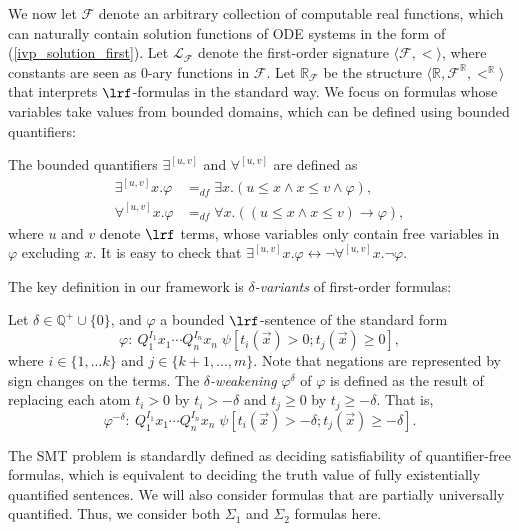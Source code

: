 \documentclass[11pt]{article}
\begin{document}
We now let $\mathcal{F}$ denote an arbitrary collection of computable real functions, which can naturally contain solution functions of ODE systems in the form of (\ref{ivp_solution_first}). Let $\mathcal{L}_{\mathcal{F}}$ denote the first-order signature $\langle \mathcal{F}, <\rangle$, where constants are seen as 0-ary functions in $\mathcal{F}$. Let $\mathbb{R}_{\mathcal{F}}$ be the  structure $\langle \mathbb{R}, \mathcal{F}^{\mathbb{R}}, <^{\mathbb{R}}\rangle$ that interprets $\lrf$-formulas in the standard way. We focus on formulas whose variables take values from bounded domains, which can be defined using bounded quantifiers:
\begin{definition}
The bounded quantifiers $\exists^{[u,v]}$ and $\forall^{[u,v]}$ are defined as
\begin{align*}
\exists^{[u,v]}x.\varphi &=_{df}\exists x. ( u \leq x \land x \leq v \wedge
\varphi),\\
\forall^{[u,v]}x.\varphi &=_{df} \forall x. ( (u \leq x \land x \leq v)
\rightarrow \varphi),
\end{align*}
where $u$ and $v$ denote $\lrf$ terms, whose variables only
contain free variables in $\varphi$ excluding $x$. It is easy to check that
$\exists^{[u,v]}x. \varphi \leftrightarrow \neg \forall^{[u,v]}x. \neg\varphi$.
\end{definition}
The key definition in our framework is {\em $\delta$-variants} of first-order formulas: 
\begin{definition}\label{variants}
Let $\delta\in \mathbb{Q}^+\cup\{0\}$, and $\varphi$ a bounded
$\lrf$-sentence of the standard form
$$\varphi: \ Q_1^{I_1}x_1\cdots Q_n^{I_n}x_n\;\psi[t_i(\vec x)>0;
t_j(\vec x)\geq 0],$$ where $i\in\{1,...k\}$ and $j\in\{k+1,...,m\}$.  Note that negations are represented by sign changes on the terms. The {\em
$\delta$-weakening} $\varphi^{\delta}$ of $\varphi$ is
defined as the result of replacing each atom $t_i > 0$ by $t_i >
-\delta$ and $t_j \geq 0$ by $t_j \geq -\delta$. That is,
$$\varphi^{-\delta}:\ Q_1^{I_1}x_1\cdots Q_n^{I_n}x_n\;\psi[t_i(\vec x)>-\delta; t_j(\vec x)\geq -\delta].$$
\end{definition}
The SMT problem is standardly defined as deciding satisfiability of quantifier-free formulas, which is equivalent to deciding the truth value of fully existentially quantified sentences. We will also consider formulas that are partially universally quantified. Thus, we consider both $\Sigma_1$ and $\Sigma_2$ formulas here.
\end{document}

